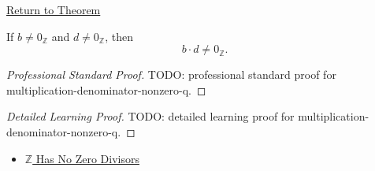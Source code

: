 \newpage
{}
\label{prf:multiplication-denominator-nonzero-q}

\begin{remark*}[Return]
\hyperref[lem:multiplication-denominator-nonzero-q]{Return to Theorem}
\end{remark*}

\begin{lemma*}
If $b\ne 0_{\mathbb{Z}}$ and $d\ne 0_{\mathbb{Z}}$, then
\[
b\cdot d\ne 0_{\mathbb{Z}}.
\]
\end{lemma*}

\begin{proof}[Professional Standard Proof]
\LRAProofBodyStart
TODO: professional standard proof for multiplication-denominator-nonzero-q.
\end{proof}

\begin{proof}[Detailed Learning Proof]
\LRAProofBodyStart
TODO: detailed learning proof for multiplication-denominator-nonzero-q.
\end{proof}

\begin{remark*}
\end{remark*}

\begin{dependencies}
\begin{itemize}
  \item \hyperref[thm:z-has-no-zero-divisors]{$\mathbb{Z}$ Has No Zero Divisors}
\end{itemize}
\end{dependencies}

\clearpage
